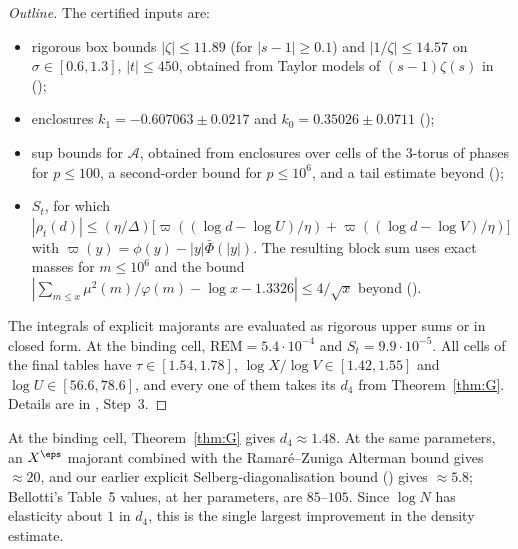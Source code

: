\begin{proof}[Outline]
The certified inputs are:
\begin{itemize}
\item rigorous box bounds $|\zeta| \le 11.89$ (for $|s-1|\ge 0.1$) and $|1/\zeta| \le 14.57$ on $\sigma\in[0.6,1.3]$, $|t|\le450$, obtained from Taylor models of $(s-1)\zeta(s)$ in  ();
\item enclosures $k_1 = -0.607063\pm0.0217$ and $k_0 = 0.35026\pm0.0711$ ();
\item sup bounds for $\mathcal A$, obtained from enclosures over cells of the $3$-torus of phases for $p\le100$, a second-order bound for $p\le10^6$, and a tail estimate beyond ();
\item $S_t$, for which $|\rho_t(d)| \le (\eta/\Delta)\big[\varpi((\log d - \log U)/\eta) + \varpi((\log d - \log V)/\eta)\big]$ with $\varpi(y) = \phi(y) - |y|\bar\Phi(|y|)$.
  The resulting block sum uses exact masses for $m\le10^6$ and the bound $|\sum_{m\le x}\mu^2(m)/\varphi(m) - \log x - 1.3326| \le 4/\sqrt x$ \cite{RamareAkhilesh} beyond ().
\end{itemize}
The integrals of explicit majorants are evaluated as rigorous upper sums or in closed form.
At the binding cell, $\mathrm{REM} = 5.4\cdot10^{-4}$ and $S_t = 9.9\cdot10^{-5}$.
All cells of the final tables have $\tau\in[1.54,1.78]$, $\log X/\log V\in[1.42,1.55]$ and $\log U\in[56.6,78.6]$, and every one of them takes its $d_4$ from Theorem~\ref{thm:G}.
Details are in , Step~3.
\end{proof}

\begin{remark}
At the binding cell, Theorem~\ref{thm:G} gives $d_4 \approx 1.48$.
At the same parameters, an $X^\eps$ majorant combined with the Ramar\'e--Zuniga Alterman bound \cite{RZA} gives $\approx 20$, and our earlier explicit Selberg-diagonalisation bound () gives $\approx 5.8$; Bellotti's Table~5 values, at her parameters, are $85$--$105$.
Since $\log N$ has elasticity about $1$ in $d_4$, this is the single largest improvement in the density estimate.
\end{remark}
